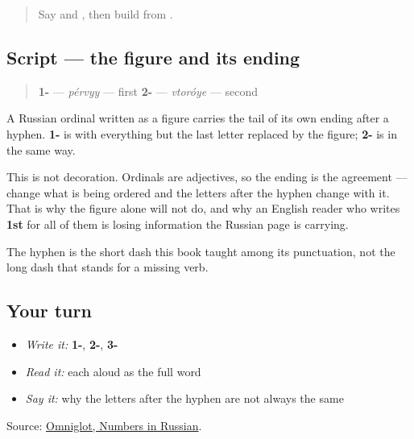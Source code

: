 \label{lesson:RU-W26-ordinal-hyphen}



\begin{quote}
Say \textbf{} and \textbf{}, then build \textbf{} from \textbf{}.
\end{quote}

\subsection*{Script — the figure and its ending}
\begin{quote}
\textbf{1-} — \emph{pérvyy} — first  \textbf{2-} — \emph{vtoróye} — second
\end{quote}

A Russian ordinal written as a figure carries the tail of its own ending after a hyphen. \textbf{1-} is \textbf{} with everything but the last letter replaced by the figure; \textbf{2-} is \textbf{} in the same way.

This is not decoration. Ordinals are adjectives, so the ending is the agreement — change what is being ordered and the letters after the hyphen change with it. That is why the figure alone will not do, and why an English reader who writes \textbf{1st} for all of them is losing information the Russian page is carrying.

The hyphen is the short dash this book taught among its punctuation, not the long dash that stands for a missing verb.

\subsection*{Your turn}
\begin{itemize}
\raggedright
  \item \emph{Write it:} \textbf{1-}, \textbf{2-}, \textbf{3-}
  \item \emph{Read it:} each aloud as the full word
  \item \emph{Say it:} why the letters after the hyphen are not always the same
\end{itemize}

\begin{tcolorbox}[breakable,colback=teal!4,colframe=teal!35!black,title={Before you move on}]
Source: \href{https://www.omniglot.com/language/numbers/russian.htm}{Omniglot, Numbers in Russian}.
\end{tcolorbox}
